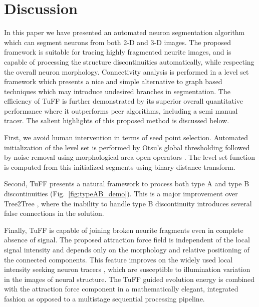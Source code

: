 \section{Discussion}

In this paper we have presented an automated neuron segmentation algorithm which can segment neurons from both 2-D and 3-D images. The proposed framework is suitable for tracing highly fragmented neurite images, and is capable of processing the structure discontinuities automatically, while respecting the overall neuron morphology. Connectivity analysis is performed in a level set framework which presents a nice and simple alternative to graph based techniques which may introduce undesired branches in segmentation. The efficiency of TuFF is further demonstrated by its superior overall quantitative performance where it outperforms peer algorithms, including a semi manual tracer. The salient highlights of this proposed method is discussed below.

First, we avoid human intervention in terms of seed point selection. Automated initialization of the level set is performed by Otsu's global thresholding \cite{otsu} followed by noise removal using morphological area open operators \cite{acton_fast}. The level set function is computed from this initialized segments using binary distance transform.

Second, TuFF presents a natural framework to process both type A and type B discontinuities (Fig.~\ref{fig:typeAB_demo}). This is a major improvement over  Tree2Tree \cite{basu_T2T_journal}, where the inability to handle type B discontinuity introduces several false connections in the solution. 

Finally, TuFF is capable of joining broken neurite fragments even in complete absence of signal. The proposed attraction force field is independent of the local signal intensity and depends only on the morphology and relative positioning of the connected components. This feature improves on the widely used local intensity seeking neuron tracers \cite{rodriguez_voxelscoop}, which are susceptible to illumination variation in the images of neural structure. The TuFF guided evolution energy is combined with the attraction force component in a mathematically elegant, integrated fashion as opposed to a multistage sequential processing pipeline.











